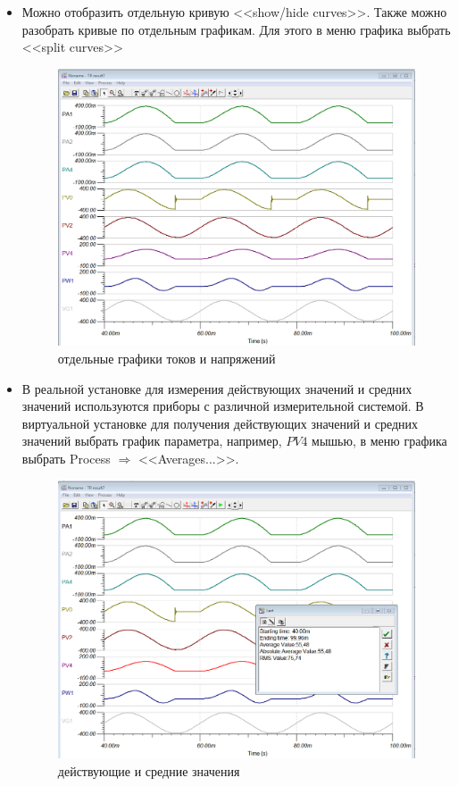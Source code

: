 \begin{itemize}
\item Можно отобразить отдельную кривую <<show/hide curves>>. Также можно разобрать кривые по отдельным графикам. 
	Для этого в меню графика выбрать <<split curves>>
\begin{figure}[!ht]
\centering
\includegraphics[scale=0.3]{result_splitted}
\caption{отдельные графики токов и напряжений}
\label{result_splitted}
\end{figure}  

\item В реальной установке для измерения действующих значений и средних значений используются приборы с различной
	измерительной системой. В виртуальной установке для получения действующих значений и средних значений
	выбрать график параметра, например, $PV4$ мышью, в меню графика выбрать Process $\Rightarrow$ <<Averages...>>.
\begin{figure}[!ht]
\centering
\includegraphics[scale=0.3]{result_rms_avg}
\caption{действующие и средние значения}
\label{result_rms_avg}
\end{figure}


\end{itemize}
